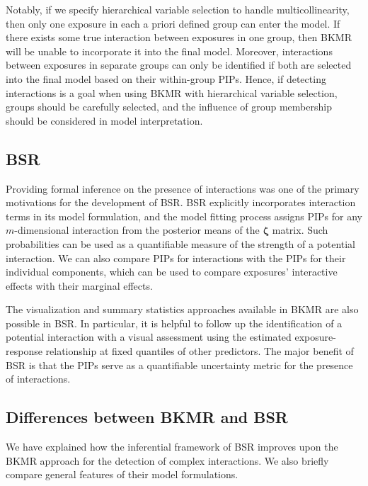 \documentclass[12pt, twoside]{amherstthesis}
\begin{document}
Notably, if we specify hierarchical variable selection to handle multicollinearity, then only one exposure in each a priori defined group can enter the model. If there exists some true interaction between exposures in one group, then BKMR will be unable to incorporate it into the final model. Moreover, interactions between exposures in separate groups can only be identified if both are selected into the final model based on their within-group PIPs. Hence, if detecting interactions is a goal when using BKMR with hierarchical variable selection, groups should be carefully selected, and the influence of group membership should be considered in model interpretation.

\hypertarget{bsr-1}{%
\subsection{BSR}\label{bsr-1}}

Providing formal inference on the presence of interactions was one of the primary motivations for the development of BSR. BSR explicitly incorporates interaction terms in its model formulation, and the model fitting process assigns PIPs for any \(m\)-dimensional interaction from the posterior means of the \(\boldsymbol\zeta\) matrix. Such probabilities can be used as a quantifiable measure of the strength of a potential interaction. We can also compare PIPs for interactions with the PIPs for their individual components, which can be used to compare exposures' interactive effects with their marginal effects.

The visualization and summary statistics approaches available in BKMR are also possible in BSR. In particular, it is helpful to follow up the identification of a potential interaction with a visual assessment using the estimated exposure-response relationship at fixed quantiles of other predictors. The major benefit of BSR is that the PIPs serve as a quantifiable uncertainty metric for the presence of interactions.

\hypertarget{differences-between-bkmr-and-bsr}{%
\subsection{Differences between BKMR and BSR}\label{differences-between-bkmr-and-bsr}}

We have explained how the inferential framework of BSR improves upon the BKMR approach for the detection of complex interactions. We also briefly compare general features of their model formulations.
\end{document}
